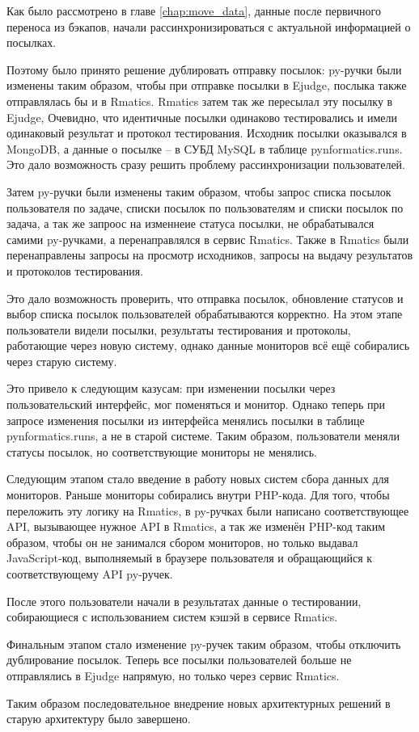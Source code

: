 Как было рассмотрено в главе \ref{chap:move_data}, 
данные после первичного переноса из бэкапов, начали рассинхронизироваться с актуальной информацией о посылках.

Поэтому было принято решение дублировать отправку посылок: 
py-ручки были изменены таким образом, чтобы при отправке посылки в Ejudge,
послыка также отправлялась бы и в Rmatics.
Rmatics затем так же пересылал эту посылку в Ejudge, 
Очевидно, что идентичные посылки одинаково тестировались и имели одинаковый результат и протокол тестирования. Исходник посылки оказывался в MongoDB,
а данные о посылке -- в СУБД MySQL в таблице pynformatics.runs.
Это дало возможность сразу решить проблему рассинхронизации пользователей.

Затем py-ручки были изменены таким образом, 
чтобы запрос списка посылок пользователя по задаче, 
списки посылок по пользователям и списки посылок по задача, а так же запроос на изменнеие статуса посылки, не обрабатывался самими py-ручками,
а перенаправлялся в сервис Rmatics.
Также в Rmatics были перенаправлены запросы на просмотр исходников,
запросы на выдачу результатов и протоколов тестирования.

Это дало возможность проверить, что отправка посылок,
обновление статусов и выбор списка посылок пользователей обрабатываются корректно.
На этом этапе пользователи видели посылки, результаты тестирования и протоколы, 
работающие через новую систему,
однако данные мониторов всё ещё собирались через старую систему.

Это привело к следующим казусам: при изменении посылки через пользовательский интерфейс, мог поменяться и монитор.
Однако теперь при запросе изменения посылки из интерфейса менялись посылки в таблице pynformatics.runs, а не в старой системе.
Таким образом, пользователи меняли статусы посылок, но соответствующие мониторы не менялись.

Следующим этапом стало введение в работу новых систем сбора данных для мониторов.
Раньше мониторы собирались внутри PHP-кода.
Для того, чтобы переложить эту логику на Rmatics, в py-ручках были написано соответствующее API, вызывающее нужное API в Rmatics,
а так же изменён PHP-код таким образом, 
чтобы он не занимался сбором мониторов, 
но только выдавал JavaScript-код, выполняемый в браузере пользователя и обращающийся к соответствующему API py-ручек.

После этого пользователи начали в результатах данные о тестировании,
собирающиеся с использованием систем кэшэй в сервисе Rmatics.

Финальным этапом стало изменение py-ручек таким образом, 
чтобы отключить дублирование посылок.
Теперь все посылки пользователей больше не отправлялись в Ejudge напрямую,
но только через сервис Rmatics.

Таким образом последовательное внедрение новых архитектурных решений в старую архитектуру было завершено.
